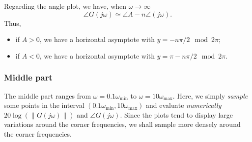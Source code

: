 \documentclass[a4paper,11pt]{report}
\theoremstyle{definition}
\begin{document}
Regarding the angle plot, we have, when $\omega\to \infty$
\[
\angle G(j\omega) \simeq \angle A - n\angle(j\omega).
\]
Thus, 
\begin{itemize}
\item if $A>0$, we have a horizontal asymptote with
$y=-n\pi/2 \mod 2\pi$;
\item  if $A<0$, we have a horizontal asymptote with
$y=\pi-n\pi/2\mod 2\pi$.
\end{itemize}


\subsubsection{Middle part}

The middle part ranges from $\omega=0.1\omega_{\min}$ to
$\omega=10\omega_{\max}$. Here, we simply \emph{sample} some points in
the interval $(0.1\omega_{\min},10\omega_{\max})$ and evaluate
\emph{numerically} $20\log(\|G(j\omega)\|)$ and $\angle
G(j\omega)$. Since the plots tend to display large variations around
the corner frequencies, we shall sample more densely around the corner
frequencies.
\end{document}
